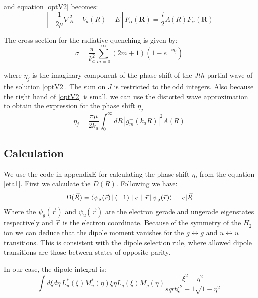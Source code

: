 and equation \eqref{optV2} becomes:
\begin{equation}\label{optApprox1}
\left[-\frac{1}{2\mu}\nabla_R^2 + V_a(R) - E\right]F_{\alpha}(\mathbf{R}) = \frac{i}{2}A(R)F_{\alpha}(\mathbf{R})
\end{equation}

The cross section for the radiative quenching is given by:
\begin{equation}
\sigma = \frac{\pi}{k_a^2}\sum_{m=0}^{\infty}{(2m+1)\left(1-e^{-4\eta_j}\right) }
\end{equation}

where $ \eta_j $ is the imaginary component of the phase shift of the $ Jth $ partial wave of the solution \eqref{optV2}. The sum on $ J $ is restricted to the odd integers. 
Also because the right hand of \eqref{optV2} is small, we can use the distorted wave approximation to obtain the expression for the phase shift $ \eta_j $
\begin{equation}\label{eta1}
\eta_j = \frac{\pi\mu}{2k_a}\int_0^{\infty}{dR\,\left|g_m^{+}\left(k_aR\right)\right|^2A(R) }
\end{equation}

\subsection{Calculation} \label{QuenchingCalculation}

We use the code in appendixE for calculating the phase shift $ \eta $, from the equation \eqref{eta1}.
First we calculate the $ D(R) $. Following \cite{DRZygelman} we have:
\begin{equation}
D(\vec{R}) = \Braket{\psi_u(\vec{r}) | (-1)\mid e \mid\,\vec{r} | \psi_g(\vec{r})} - |e|\vec{R}
\end{equation}
Where the $ \psi_g(\vec{r}) $ and $ \psi_u(\vec{r}) $ are the electron gerade and ungerade eigenstates respectively and $ \vec{r} $ is the electron coordinate. 
Because of the symmetry of the $ H_2^+ $ ion we can deduce that the dipole moment vanishes for the $ g \leftrightarrow g $ and $ u \leftrightarrow u $ transitions. This is consistent with the dipole selection rule, where allowed dipole transitions are those between states of opposite parity.

In our case, the dipole integral is:
\begin{equation}
  \int{d\xi d\eta\,L_u^*(\xi)M_u^*(\eta)\xi \eta L_g(\xi)M_g(\eta)\frac{\xi^2-\eta^2}{sqrt{\xi^2-1}\sqrt{1-\eta^2}}}
\end{equation}

